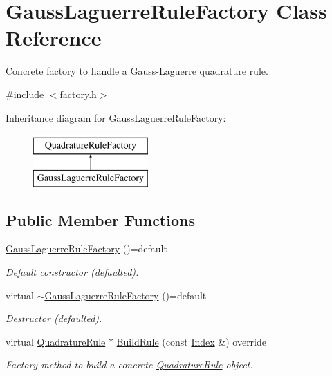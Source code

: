 \hypertarget{classGaussLaguerreRuleFactory}{\section{Gauss\-Laguerre\-Rule\-Factory Class Reference}
\label{classGaussLaguerreRuleFactory}
}


Concrete factory to handle a Gauss-\/\-Laguerre quadrature rule.  




{\ttfamily \#include $<$factory.\-h$>$}

Inheritance diagram for Gauss\-Laguerre\-Rule\-Factory\-:\begin{figure}[H]
\begin{center}
\leavevmode
\includegraphics[height=2.000000cm]{classGaussLaguerreRuleFactory}
\end{center}
\end{figure}
\subsection*{Public Member Functions}
\begin{DoxyCompactItemize}
\item 
\hypertarget{classGaussLaguerreRuleFactory_aec92163584eea1e9fdc921afdfafba2e}{\hyperlink{classGaussLaguerreRuleFactory_aec92163584eea1e9fdc921afdfafba2e}{Gauss\-Laguerre\-Rule\-Factory} ()=default}\label{classGaussLaguerreRuleFactory_aec92163584eea1e9fdc921afdfafba2e}

\begin{DoxyCompactList}\small\item\em Default constructor (defaulted). \end{DoxyCompactList}\item 
\hypertarget{classGaussLaguerreRuleFactory_a8d39539bf7e6dd34cc298cf8c58060c8}{virtual \hyperlink{classGaussLaguerreRuleFactory_a8d39539bf7e6dd34cc298cf8c58060c8}{$\sim$\-Gauss\-Laguerre\-Rule\-Factory} ()=default}\label{classGaussLaguerreRuleFactory_a8d39539bf7e6dd34cc298cf8c58060c8}

\begin{DoxyCompactList}\small\item\em Destructor (defaulted). \end{DoxyCompactList}\item 
virtual \hyperlink{classQuadratureRule}{Quadrature\-Rule} $\ast$ \hyperlink{classGaussLaguerreRuleFactory_a1e907a5209041516fa18c86c79fb1ec6}{Build\-Rule} (const \hyperlink{typedefs_8h_a2c726f8f32697958e9d6c2afecda531d}{Index} \&) override
\begin{DoxyCompactList}\small\item\em Factory method to build a concrete \hyperlink{classQuadratureRule}{Quadrature\-Rule} object. \end{DoxyCompactList}\end{DoxyCompactItemize}


